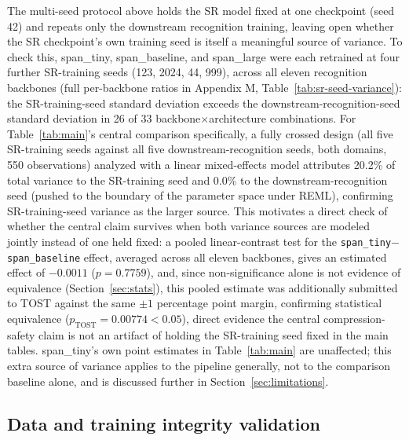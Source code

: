 \documentclass[pdflatex,sn-vancouver-num]{sn-jnl}
\begin{document}
The multi-seed protocol above holds the SR model fixed at one checkpoint (seed 42) and repeats only the downstream recognition training, leaving open whether the SR checkpoint's own training seed is itself a meaningful source of variance. To check this, span\_tiny, span\_baseline, and span\_large were each retrained at four further SR-training seeds (123, 2024, 44, 999), across all eleven recognition backbones (full per-backbone ratios in Appendix M, Table~\ref{tab:sr-seed-variance}): the SR-training-seed standard deviation exceeds the downstream-recognition-seed standard deviation in 26 of 33 backbone$\times$architecture combinations. For Table~\ref{tab:main}'s central comparison specifically, a fully crossed design (all five SR-training seeds against all five downstream-recognition seeds, both domains, 550 observations) analyzed with a linear mixed-effects model attributes 20.2\% of total variance to the SR-training seed and 0.0\% to the downstream-recognition seed (pushed to the boundary of the parameter space under REML), confirming SR-training-seed variance as the larger source. This motivates a direct check of whether the central claim survives when both variance sources are modeled jointly instead of one held fixed: a pooled linear-contrast test for the \texttt{span\_tiny}$-$\texttt{span\_baseline} effect, averaged across all eleven backbones, gives an estimated effect of $-0.0011$ ($p=0.7759$), and, since non-significance alone is not evidence of equivalence (Section~\ref{sec:stats}), this pooled estimate was additionally submitted to TOST against the same $\pm 1$ percentage point margin, confirming statistical equivalence ($p_{\text{TOST}}=0.00774<0.05$), direct evidence the central compression-safety claim is not an artifact of holding the SR-training seed fixed in the main tables. span\_tiny's own point estimates in Table~\ref{tab:main} are unaffected; this extra source of variance applies to the pipeline generally, not to the comparison baseline alone, and is discussed further in Section~\ref{sec:limitations}.

\subsection{Data and training integrity validation}
\label{sec:integrity}
\end{document}
